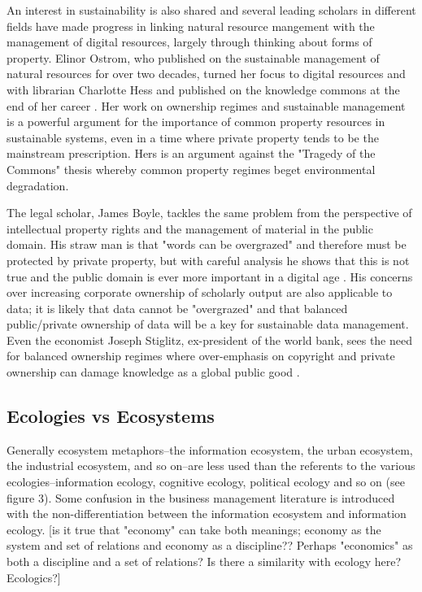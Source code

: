 An interest in sustainability is also shared and several leading scholars in different fields have made progress in linking natural resource mangement with the management of digital resources, largely through thinking about forms of property. Elinor Ostrom, who published on the sustainable management of natural resources for over two decades, turned her focus to digital resources and with librarian Charlotte Hess and published on the knowledge commons at the end of her career \citep{hess_2006}. Her work on ownership regimes and sustainable management is a powerful argument for the importance of common property resources in sustainable systems, even in a time where private property tends to be the mainstream prescription. Hers is an argument against the "Tragedy of the Commons" thesis whereby common property regimes beget environmental degradation.

The legal scholar, James Boyle, tackles the same problem from the perspective of intellectual property rights and the management of material in the public domain. His straw man is that "words can be overgrazed" and therefore must be protected by private property, but with careful analysis he shows that this is not true and the public domain is ever more important in a digital age \citep[][footnote 15 on p. 5]{boyle_2003}. His concerns over increasing corporate ownership of scholarly output are also applicable to data; it is likely that data cannot be "overgrazed" and that balanced public/private ownership of data will be a key for sustainable data management. Even the economist Joseph Stiglitz, ex-president of the world bank, sees the need for balanced ownership regimes where over-emphasis on copyright and private ownership can damage knowledge as a global public good \citep{stiglitz_1999}.

\subsection{Ecologies vs Ecosystems}

Generally ecosystem metaphors--the information ecosystem, the urban ecosystem, the industrial ecosystem, and so on--are less used than the referents to the various ecologies--information ecology, cognitive ecology, political ecology and so on (see figure 3). Some confusion in the business management literature is introduced with the non-differentiation between the information ecosystem and information ecology. [is it true that "economy" can take both meanings; economy as the system and set of relations and economy as a discipline?? Perhaps "economics" as both a discipline and a set of relations? Is there a similarity with ecology here? Ecologics?]

